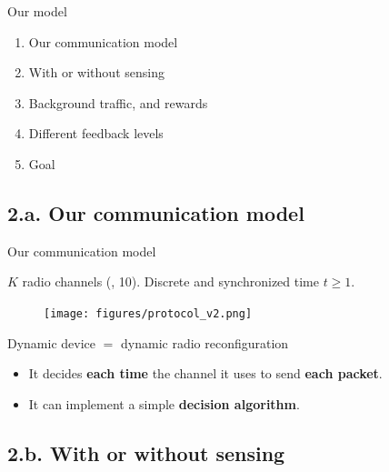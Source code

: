 \documentclass[12pt,english,ignorenonframetext,aspectratio=169,]{beamer}
\providecommand{\tightlist}{%
  \setlength{\itemsep}{0pt}\setlength{\parskip}{0pt}}
\begin{document}
\begin{frame}{Our model}

\begin{enumerate}
\def\labelenumi{\arabic{enumi}.}
\tightlist
\item Our communication model
\item With or without sensing
\item Background traffic, and rewards
\item Different feedback levels
\item Goal
\end{enumerate}

\end{frame}

\subsection{\hfill{}2.a. Our communication model\hfill{}}

\begin{frame}{Our communication model}

\(K\) radio channels (\eg, 10).
Discrete and synchronized time \(t\geq1\).

\begin{figure}[h!]
\centering
\texttt{[image: figures/protocol\_v2.png]}
\end{figure}

\pause

\begin{block}{Dynamic device \(=\) dynamic radio reconfiguration}

\begin{itemize}\tightlist
\item
  It decides \textbf{each time} the channel it uses to send \textbf{each
  packet}.
\item
  It can implement a simple \textbf{decision algorithm}.
\end{itemize}

\end{block}

\end{frame}



\subsection{\hfill{}2.b. With or without sensing\hfill{}}
\end{document}
